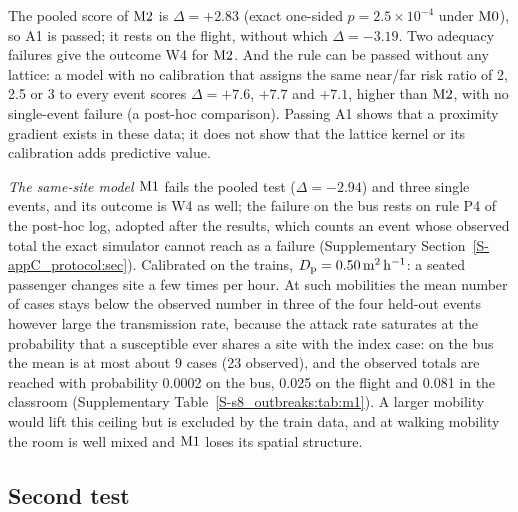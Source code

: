 The pooled score of $\mathrm{M2}$ is $\Delta=+2.83$ (exact one-sided $p=2.5\times10^{-4}$ under $\mathrm{M0}$), so A1 is
passed; it rests on the flight, without which $\Delta=-3.19$. Two adequacy failures give the outcome W4 for
$\mathrm{M2}$. And the rule can be passed without any lattice: a model with no calibration that assigns the same
near/far risk ratio of 2, 2.5 or 3 to every event scores $\Delta=+7.6$, $+7.7$ and $+7.1$, higher than $\mathrm{M2}$,
with no single-event failure (a post-hoc comparison). Passing A1 shows that a proximity gradient exists in these
data; it does not show that the lattice kernel or its calibration adds predictive value.

\emph{The same-site model $\mathrm{M1}$} fails the pooled test ($\Delta=-2.94$) and three single events, and its
outcome is W4 as well; the failure on the bus rests on rule P4 of the post-hoc log, adopted after the results,
which counts an event whose observed total the exact simulator cannot reach as a failure (Supplementary
Section~\ref{S-appC_protocol:sec}). Calibrated on the trains, $D_{\mathrm{p}}=0.50\,\mathrm{m}^2\,\mathrm{h}^{-1}$: a seated passenger changes site a few times
per hour. At such mobilities the mean number of cases stays below the observed number in three of the four
held-out events however large the transmission rate, because the attack rate saturates at the probability that
a susceptible ever shares a site with the index case: on the bus the mean is at most about 9 cases (23
observed), and the observed totals are reached with probability 0.0002 on the bus, 0.025 on the flight and 0.081
in the classroom (Supplementary Table~\ref{S-s8_outbreaks:tab:m1}). A larger mobility would lift this ceiling but
is excluded by the train data, and at walking mobility the room is well mixed and $\mathrm{M1}$ loses its spatial
structure.

\subsection{Second test}\label{s8_outbreaks:sec:second}

